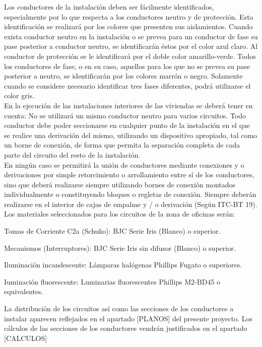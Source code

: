 Los conductores de la instalación deben ser fácilmente identificados, especialmente por lo que respecta a los conductores neutro y de protección. Esta identificación se realizará por los colores que presenten sus aislamientos. Cuando exista conductor neutro en la instalación o se prevea para un conductor de fase su pase posterior a conductor neutro, se identificarán éstos por el color azul claro. Al conductor de protección se le identificará por el doble color amarillo-verde. Todos los conductores de fase, o en su caso, aquellos para los que no se prevea su pase posterior a neutro, se identificarán por los colores marrón o negro. Solamente cuando se considere necesario identificar tres fases diferentes, podrá utilizarse el color gris.\\

En la ejecución de las instalaciones interiores de las viviendas se deberá tener en cuenta:
No se utilizará un mismo conductor neutro para varios circuitos. Todo conductor debe poder seccionarse en cualquier punto de la instalación en el que se realice una derivación del mismo, utilizando un dispositivo apropiado, tal como un borne de conexión, de forma que permita la separación completa de cada parte del circuito del resto de la instalación.\\

En ningún caso se permitirá la unión de conductores mediante conexiones y o derivaciones por simple retorcimiento o arrollamiento entre sí de los conductores, sino que deberá realizarse siempre utilizando bornes de conexión montados individualmente o constituyendo bloques o regletas de conexión. Siempre deberán realizarse en el interior de cajas de empalme y / o derivación (Según ITC-BT 19).\\

Los materiales seleccionados para los circuitos de la zona de oficinas serán:

Tomas de Corriente C2a (Schuko): BJC Serie Iris (Blanco) o superior.

Mecanismos (Interruptores): BJC Serie Iris sin difusor (Blanco) o superior.

Iluminación incandescente: Lámparas halógenas Phillips Fugato o superiores.

Iuminación fluorescente: Luminarias fluorescentes Phillips M2-BD45 o equivalentes.

La distribución de los circuitos así como las secciones de los conductores a instalar aparecen reflejados en el apartado [PLANOS] del presente proyecto. Los cálculos de las secciones de los conductores vendrán justificados en el apartado [CALCULOS]


